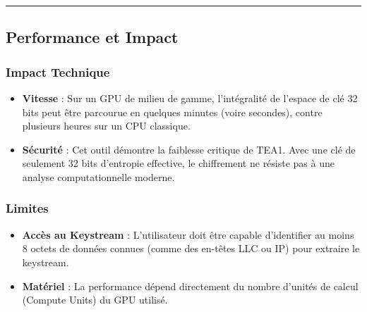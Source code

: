 \documentclass[
  french,
]{article}
\providecommand{\tightlist}{%
  \setlength{\itemsep}{0pt}\setlength{\parskip}{0pt}}
\begin{document}
\begin{center}\rule{0.5\linewidth}{0.5pt}\end{center}

\subsection{Performance et Impact}\label{performance-et-impact}

\subsubsection{Impact Technique}\label{impact-technique}

\begin{itemize}
\tightlist
\item
  \textbf{Vitesse} : Sur un GPU de milieu de gamme, l'intégralité de
  l'espace de clé 32 bits peut être parcourue en quelques minutes (voire
  secondes), contre plusieurs heures sur un CPU classique.
\item
  \textbf{Sécurité} : Cet outil démontre la faiblesse critique de TEA1.
  Avec une clé de seulement 32 bits d'entropie effective, le chiffrement
  ne résiste pas à une analyse computationnelle moderne.
\end{itemize}

\subsubsection{Limites}\label{limites-1}

\begin{itemize}
\tightlist
\item
  \textbf{Accès au Keystream} : L'utilisateur doit être capable
  d'identifier au moins 8 octets de données connues (comme des en-têtes
  LLC ou IP) pour extraire le keystream.
\item
  \textbf{Matériel} : La performance dépend directement du nombre
  d'unités de calcul (Compute Units) du GPU utilisé.
\end{itemize}
\end{document}
